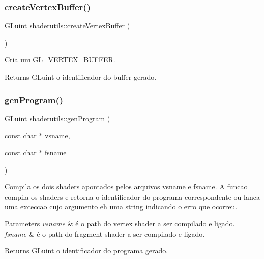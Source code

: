 \subsubsection{\texorpdfstring{create\+Vertex\+Buffer()}{createVertexBuffer()}}
{\footnotesize\ttfamily G\+Luint shaderutils\+::create\+Vertex\+Buffer (\begin{DoxyParamCaption}{ }\end{DoxyParamCaption})}

Cria um G\+L\+\_\+\+V\+E\+R\+T\+E\+X\+\_\+\+B\+U\+F\+F\+ER. \begin{DoxyReturn}{Returns}
G\+Luint o identificador do buffer gerado. 
\end{DoxyReturn}
\mbox{\label{namespaceshaderutils_a30962b257d22ef93daf84638ab350c54}} 
\subsubsection{\texorpdfstring{gen\+Program()}{genProgram()}}
{\footnotesize\ttfamily G\+Luint shaderutils\+::gen\+Program (\begin{DoxyParamCaption}\item[{const char $\ast$}]{vsname,  }\item[{const char $\ast$}]{fsname }\end{DoxyParamCaption})}

Compila os dois shaders apontados pelos arquivos vsname e fsname. A funcao compila os shaders e retorna o identificador do programa correspondente ou lanca uma exceccao cujo argumento eh uma string indicando o erro que ocorreu. 
\begin{DoxyParams}{Parameters}
{\em vsname} & é o path do vertex shader a ser compilado e ligado. \\
\hline
{\em fsname} & é o path do fragment shader a ser compilado e ligado. \\
\hline
\end{DoxyParams}
\begin{DoxyReturn}{Returns}
G\+Luint o identificador do programa gerado. 
\end{DoxyReturn}
\mbox{\label{namespaceshaderutils_a65da9931b0094fc28feb81c3e561f0f0}} 
